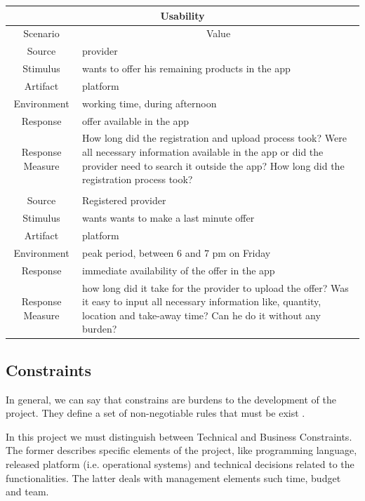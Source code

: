 \begin{table}[H]
    \begin{tabularx}{\textwidth}{|c|X|}
        \hline
        \multicolumn{2}{c}{\textbf{Usability}} \\
        \hline
        \toprule
        \multicolumn{1}{c}{Scenario} & \multicolumn{1}{c}{Value} \\
        \midrule
        Source & \gls{provider} \\
        Stimulus & wants to offer his remaining products in the app \\
        Artifact & platform \\
        Environment & working time, during afternoon \\
        Response & offer available in the app \\
        Response Measure & How long did the registration and upload process took? Were all necessary information
        available in the app or did the \gls{provider} need to search it outside the app? How long did the registration
        process took? \\
         & \\
        Source & Registered \gls{provider} \\
        Stimulus & wants wants to make a last minute offer \\
        Artifact & platform \\
        Environment & peak period, between 6 and 7 pm on Friday \\
        Response & immediate availability of the offer in the app \\
        Response Measure & how long did it take for the \gls{provider} to upload the offer? Was it easy to input all
        necessary information like, quantity, location and take-away time? Can he do it without any burden? \\
        \bottomrule
    \end{tabularx}
\end{table}

\newpage
\subsection{Constraints}

In general, we can say that constrains are burdens to the development of the project. They define a set of non-negotiable
rules that must be exist \cite{refonline:EFAD}. 

In this project we must distinguish between Technical and Business Constraints. The former describes specific elements
of the project, like programming language, released platform (i.e. operational systems) and technical decisions related to 
the functionalities. The latter deals with management elements\cite{refonline:EFAD} such time, budget and team.


